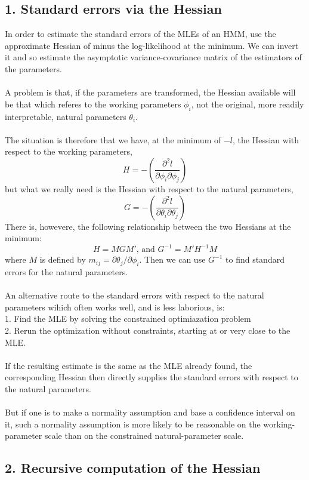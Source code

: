 \documentclass{article}
\begin{document}
\subsection*{1. Standard errors via the Hessian}
In order to estimate the standard errors of the MLEs of an HMM, use the approximate Hessian of minus the log-likelihood at the minimum. We can invert it and so estimate the asymptotic variance-covariance matrix of the estimators of the parameters. \\
\\
A problem is that, if the parameters are transformed, the Hessian available will be that which referes to the working parameters $\phi_{i}$, not the original, more readily interpretable, natural parameters $\theta_i$. \\
\\
The situation is therefore that we have, at the minimum of $-l$, the Hessian with respect to the working parameters, 
$$H = -(\frac{\partial^2 l}{\partial \phi_i \partial \phi_j})$$
but what we really need is the Hessian with respect to the natural parameters, 
$$G = - (\frac{\partial^2 l}{\partial \theta_i \partial \theta_j})$$
There is, howevere, the following relationship between the two Hessians at the minimum:
$$H = MGM' \text{, and } G^{-1} = M' H^{-1} M$$
where $M$ is defined by $m_{ij} = \partial \theta_j / \partial \phi_i$. Then we can use $G^{-1}$ to find standard errors for the natural parameters. \\
\\
An alternative route to the standard errors with respect to the natural parameters wihich often works well, and is less laborious, is: \\
1. Find the MLE by solving the constrained optimiazation problem \\
2. Rerun the optimization without constraints, starting at or very close to the MLE. \\
\\
If the resulting estimate is the same as the MLE already found, the corresponding Hessian then directly supplies the standard errors with respect to the natural parameters. \\
\\
But if one is to make a normality assumption and base a confidence interval on it, such a normality assumption is more likely to be reasonable on the working-parameter scale than on the constrained natural-parameter scale. 

\subsection*{2. Recursive computation of the Hessian}
\end{document}
